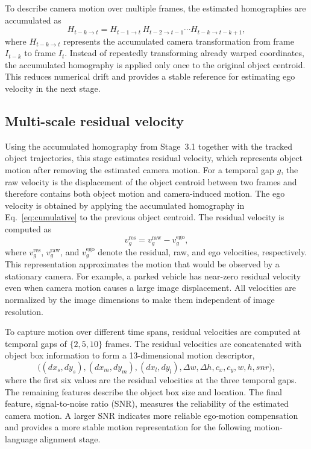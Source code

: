 \documentclass[sigconf,anonymous,nonacm]{acmart}
\begin{document}
To describe camera motion over multiple frames, the estimated homographies are accumulated as
\begin{equation}
H_{t-k\to t} = H_{t-1\to t}\, H_{t-2\to t-1} \cdots H_{t-k\to t-k+1},
\label{eq:cumulative}
\end{equation}
where $H_{t-k\to t}$ represents the accumulated camera transformation from frame $I_{t-k}$ to frame $I_t$. Instead of repeatedly transforming already warped coordinates, the accumulated homography is applied only once to the original object centroid. This reduces numerical drift and provides a stable reference for estimating ego velocity in the next stage.

\subsection{Multi-scale residual velocity}
\label{sec:residual}

Using the accumulated homography from Stage~3.1 together with the tracked object trajectories, this stage estimates residual velocity, which represents object motion after removing the estimated camera motion. For a temporal gap $g$, the raw velocity is the displacement of the object centroid between two frames and therefore contains both object motion and camera-induced motion. The ego velocity is obtained by applying the accumulated homography in Eq.~\ref{eq:cumulative} to the previous object centroid. The residual velocity is computed as
\begin{equation}
v^{\mathrm{res}}_{g} = v^{\mathrm{raw}}_{g} - v^{\mathrm{ego}}_{g},
\label{eq:residual}
\end{equation}
where $v^{\mathrm{res}}_g$, $v^{\mathrm{raw}}_g$, and $v^{\mathrm{ego}}_g$ denote the residual, raw, and ego velocities, respectively. This representation approximates the motion that would be observed by a stationary camera. For example, a parked vehicle has near-zero residual velocity even when camera motion causes a large image displacement. All velocities are normalized by the image dimensions to make them independent of image resolution.

To capture motion over different time spans, residual velocities are computed at temporal gaps of $\{2,5,10\}$ frames. The residual velocities are concatenated with object box information to form a 13-dimensional motion descriptor,
\begin{equation}
\bigl((dx_s,dy_s),(dx_m,dy_m),(dx_l,dy_l),\Delta w,\Delta h,c_x,c_y,w,h,\mathit{snr}\bigr),
\label{eq:descriptor}
\end{equation}
where the first six values are the residual velocities at the three temporal gaps. The remaining features describe the object box size and location. The final feature, signal-to-noise ratio (SNR), measures the reliability of the estimated camera motion. A larger SNR indicates more reliable ego-motion compensation and provides a more stable motion representation for the following motion-language alignment stage.
\end{document}
